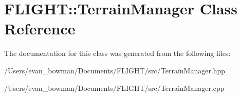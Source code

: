 \hypertarget{class_f_l_i_g_h_t_1_1_terrain_manager}{}\section{F\+L\+I\+G\+HT\+:\+:Terrain\+Manager Class Reference}
\label{class_f_l_i_g_h_t_1_1_terrain_manager}


The documentation for this class was generated from the following files\+:\begin{DoxyCompactItemize}
\item 
/\+Users/evan\+\_\+bowman/\+Documents/\+F\+L\+I\+G\+H\+T/src/Terrain\+Manager.\+hpp\item 
/\+Users/evan\+\_\+bowman/\+Documents/\+F\+L\+I\+G\+H\+T/src/Terrain\+Manager.\+cpp\end{DoxyCompactItemize}
